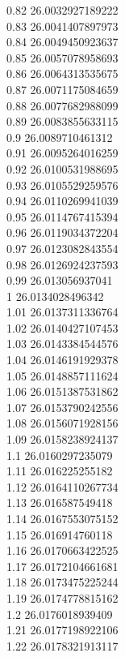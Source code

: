 {0.82	26.0032927189222\\
0.83	26.0041407897973\\
0.84	26.0049450923637\\
0.85	26.0057078958693\\
0.86	26.0064313535675\\
0.87	26.0071175084659\\
0.88	26.0077682988099\\
0.89	26.0083855633115\\
0.9	26.0089710461312\\
0.91	26.0095264016259\\
0.92	26.0100531988695\\
0.93	26.0105529259576\\
0.94	26.0110269941039\\
0.95	26.0114767415394\\
0.96	26.0119034372204\\
0.97	26.0123082843554\\
0.98	26.0126924237593\\
0.99	26.013056937041\\
1	26.0134028496342\\
1.01	26.0137311336764\\
1.02	26.0140427107453\\
1.03	26.0143384544576\\
1.04	26.0146191929378\\
1.05	26.0148857111624\\
1.06	26.0151387531862\\
1.07	26.0153790242556\\
1.08	26.0156071928156\\
1.09	26.0158238924137\\
1.1	26.0160297235079\\
1.11	26.016225255182\\
1.12	26.0164110267734\\
1.13	26.016587549418\\
1.14	26.0167553075152\\
1.15	26.016914760118\\
1.16	26.0170663422525\\
1.17	26.0172104661681\\
1.18	26.0173475225244\\
1.19	26.0174778815162\\
1.2	26.0176018939409\\
1.21	26.0177198922106\\
1.22	26.0178321913117\\
}
